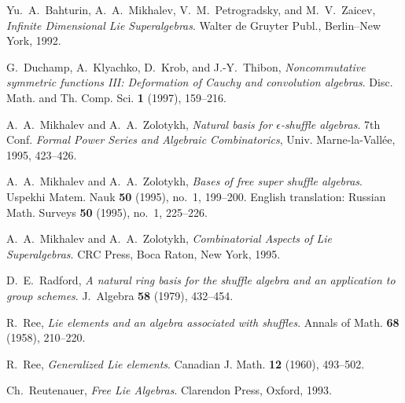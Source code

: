 \begin{thebibliography}{99999}

  Yu.~A.~Bahturin, A.~A.~Mikhalev, V.~M.~Petrogradsky, and M.~V.~Zaicev,
  {\it Infinite Dimensional Lie Superalgebras\/}. Walter de Gruyter Publ.,
  Berlin--New York, 1992.

  G.~Duchamp, A.~Klyachko, D.~Krob, and J.-Y.~Thibon,
{\it Noncommutative symmetric functions III: Deformation of Cauchy and
convolution algebras\/}.
Disc. Math. and Th. Comp. Sci. {\bf 1} (1997), \hbox{159--216}.

A.~A.~Mikhalev and A.~A.~Zolotykh,
{\it Natural basis for $\epsilon$-shuffle algebras\/}.
7th Conf. {\sl Formal Power Series and
Algebraic Combinatorics\/},
Univ. Marne-la-Vall\'ee, 1995,
\hbox{423--426}.

A.~A.~Mikhalev and A.~A.~Zolotykh,
{\it Bases of free super shuffle algebras\/}.
Uspekhi  Matem. Nauk {\bf 50} (1995), no.~1, \hbox{199--200}.
English translation: Russian Math. Surveys {\bf 50} (1995), no.~1,
\hbox{225--226}.

  A.~A.~Mikhalev and A.~A.~Zolotykh, {\it Combinatorial Aspects
  of  Lie Superalgebras\/}. CRC Press, Boca Raton, New York, 1995.

D.~E.~Radford, {\it A natural ring basis for the shuffle algebra and an
application to group schemes\/}. J.~Algebra {\bf 58} (1979),
\hbox{432--454}.

R.~Ree, {\it Lie elements and an algebra associated with shuffles\/}.
Annals of Math. {\bf 68} (1958), \hbox{210--220}.

R.~Ree, {\it Generalized Lie elements\/}. Canadian J. Math. {\bf 12}
(1960), \hbox{493--502}.


Ch.~Reutenauer, {\it Free Lie Algebras\/}. Clarendon Press, Oxford,
1993.

\end{thebibliography}



